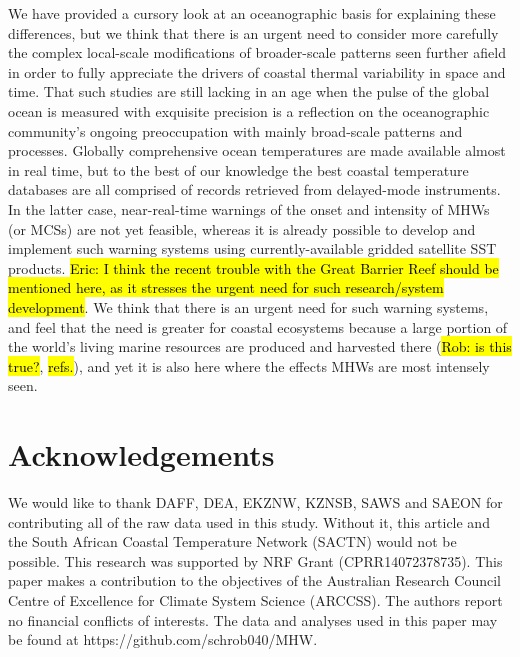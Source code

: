 \documentclass[a4paper,10pt,review]{elsarticle}
\begin{document}
We have provided a cursory look at an oceanographic basis for explaining these differences, but we think that there is an urgent need to consider more carefully the complex local-scale modifications of broader-scale patterns seen further afield in order to fully appreciate the drivers of coastal thermal variability in space and time. That such studies are still lacking in an age when the pulse of the global ocean is measured with exquisite precision is a reflection on the oceanographic community's ongoing preoccupation with mainly broad-scale patterns and processes. Globally comprehensive ocean temperatures are made available almost in real time, but to the best of our knowledge the best coastal temperature databases are all comprised of records retrieved from delayed-mode instruments. In the latter case, near-real-time warnings of the onset and intensity of MHWs (or MCSs) are not yet feasible, whereas it is already possible to develop and implement such warning systems using currently-available gridded satellite SST products. \hl{Eric: I think the recent trouble with the Great Barrier Reef should be mentioned here, as it stresses the urgent need for such research/system development}. We think that there is an urgent need for such warning systems, and feel that the need is greater for coastal ecosystems because a large portion of the world's living marine resources are produced and harvested there (\hl{Rob: is this true?}, \hl{refs.}), and yet it is also here where the effects MHWs are most intensely seen.

\section*{Acknowledgements}
We would like to thank DAFF, DEA, EKZNW, KZNSB, SAWS and SAEON for contributing all of the raw data used in this study. Without it, this article and the South African Coastal Temperature Network (SACTN) would not be possible. This research was supported by NRF Grant (CPRR14072378735). This paper makes a contribution to the objectives of the Australian Research Council Centre of Excellence for Climate System Science (ARCCSS). The authors report no financial conflicts of interests. The data and analyses used in this paper may be found at https://github.com/schrob040/MHW.

\newcommand{\beginsupplement}{%
        \setcounter{table}{0}
        \renewcommand{\thetable}{S\arabic{table}}%
        \setcounter{figure}{0}
        \renewcommand{\thefigure}{S\arabic{figure}}%
     }
\beginsupplement
\end{document}
